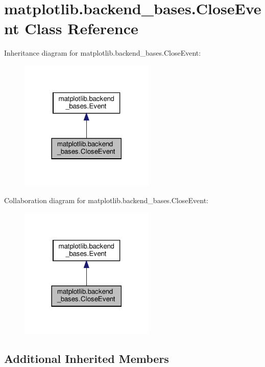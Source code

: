 \hypertarget{classmatplotlib_1_1backend__bases_1_1CloseEvent}{}\section{matplotlib.\+backend\+\_\+bases.\+Close\+Event Class Reference}
\label{classmatplotlib_1_1backend__bases_1_1CloseEvent}


Inheritance diagram for matplotlib.\+backend\+\_\+bases.\+Close\+Event\+:
\nopagebreak
\begin{figure}[H]
\begin{center}
\leavevmode
\includegraphics[width=182pt]{classmatplotlib_1_1backend__bases_1_1CloseEvent__inherit__graph}
\end{center}
\end{figure}


Collaboration diagram for matplotlib.\+backend\+\_\+bases.\+Close\+Event\+:
\nopagebreak
\begin{figure}[H]
\begin{center}
\leavevmode
\includegraphics[width=182pt]{classmatplotlib_1_1backend__bases_1_1CloseEvent__coll__graph}
\end{center}
\end{figure}
\subsection*{Additional Inherited Members}


